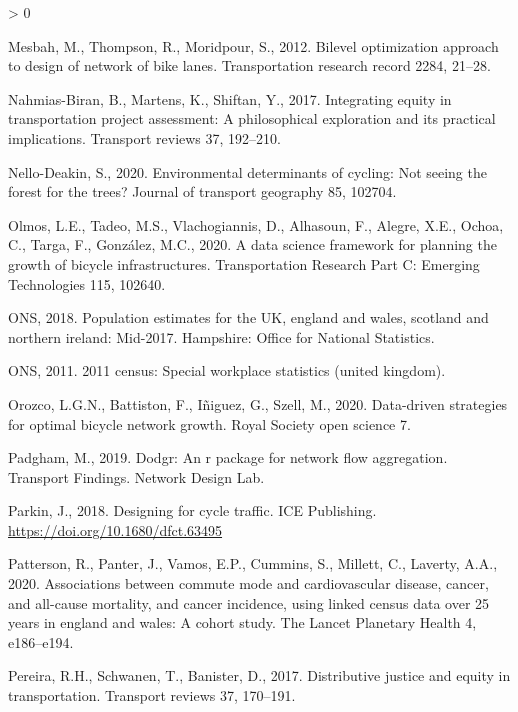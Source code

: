 \documentclass[
]{article}
\newlength{\cslhangindent}
\newenvironment{CSLReferences}[2] %
 {%
  \setlength{\parindent}{0pt}
  \ifodd #1 \everypar{\setlength{\hangindent}{\cslhangindent}}\ignorespaces\fi
  \ifnum #2 > 0
  \setlength{\parskip}{#2\baselineskip}
  \fi
 }%
 {}
\begin{document}
\begin{CSLReferences}{1}{0}
\leavevmode\hypertarget{ref-mesbah2012bilevel}{}%
Mesbah, M., Thompson, R., Moridpour, S., 2012. Bilevel optimization approach to design of network of bike lanes. Transportation research record 2284, 21--28.

\leavevmode\hypertarget{ref-nahmias2017integrating}{}%
Nahmias-Biran, B., Martens, K., Shiftan, Y., 2017. Integrating equity in transportation project assessment: A philosophical exploration and its practical implications. Transport reviews 37, 192--210.

\leavevmode\hypertarget{ref-nello2020environmental}{}%
Nello-Deakin, S., 2020. Environmental determinants of cycling: Not seeing the forest for the trees? Journal of transport geography 85, 102704.

\leavevmode\hypertarget{ref-olmos2020data}{}%
Olmos, L.E., Tadeo, M.S., Vlachogiannis, D., Alhasoun, F., Alegre, X.E., Ochoa, C., Targa, F., González, M.C., 2020. A data science framework for planning the growth of bicycle infrastructures. Transportation Research Part C: Emerging Technologies 115, 102640.

\leavevmode\hypertarget{ref-ofn2018population}{}%
ONS, 2018. Population estimates for the UK, england and wales, scotland and northern ireland: Mid-2017. Hampshire: Office for National Statistics.

\leavevmode\hypertarget{ref-ONS2011flowdata}{}%
ONS, 2011. 2011 census: Special workplace statistics (united kingdom).

\leavevmode\hypertarget{ref-orozco2020data}{}%
Orozco, L.G.N., Battiston, F., Iñiguez, G., Szell, M., 2020. Data-driven strategies for optimal bicycle network growth. Royal Society open science 7.

\leavevmode\hypertarget{ref-padgham2019dodgr}{}%
Padgham, M., 2019. Dodgr: An r package for network flow aggregation. Transport Findings. Network Design Lab.

\leavevmode\hypertarget{ref-parkin2018designing}{}%
Parkin, J., 2018. Designing for cycle traffic. ICE Publishing. \url{https://doi.org/10.1680/dfct.63495}

\leavevmode\hypertarget{ref-patterson2020associations}{}%
Patterson, R., Panter, J., Vamos, E.P., Cummins, S., Millett, C., Laverty, A.A., 2020. Associations between commute mode and cardiovascular disease, cancer, and all-cause mortality, and cancer incidence, using linked census data over 25 years in england and wales: A cohort study. The Lancet Planetary Health 4, e186--e194.

\leavevmode\hypertarget{ref-pereira2017distributive}{}%
Pereira, R.H., Schwanen, T., Banister, D., 2017. Distributive justice and equity in transportation. Transport reviews 37, 170--191.


\end{CSLReferences}
\end{document}
